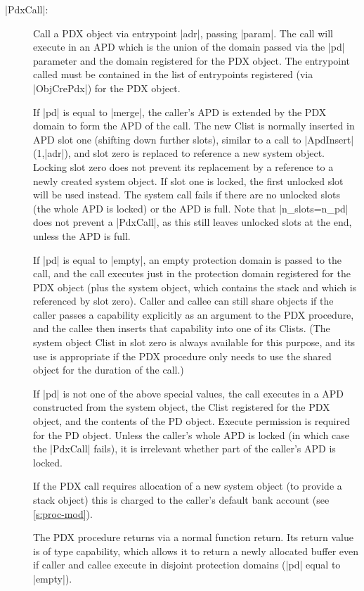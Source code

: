 \documentclass[a4paper,11pt,twoside,dvips]{report}
\begin{document}
\begin{description}
\begin{sloppypar}
\end{sloppypar}

\item[|PdxCall|:] Call a PDX object via entrypoint |adr|,
passing |param|. The call will execute in an APD which is the union of
the domain passed via the |pd| parameter and the domain registered for
the PDX object. The entrypoint called must be contained in the list of
entrypoints registered (via |ObjCrePdx|) for the PDX object.

If |pd| is equal to |merge|, the caller's APD is extended by the PDX
domain to form the APD of the call. The new Clist is normally inserted
in APD slot one (shifting down further slots), similar to a call to
|ApdInsert|(1,|adr|), and slot zero is replaced to reference a new
system object. Locking slot zero does not prevent its replacement by a
reference to a newly created system object. If slot one is locked, the
first unlocked slot will be used instead. The system call fails if there
are no unlocked slots (the whole APD is locked) or the APD is full. Note
that |n\_slots=n\_pd| does not prevent a |PdxCall|, as this still leaves
unlocked slots at the end, unless the APD is full.

If |pd| is equal to |empty|, an empty protection domain is passed to the
call, and the call executes just in the protection domain registered for
the PDX object (plus the system object, which contains the stack and
which is referenced by slot zero). Caller and callee can still share
objects if the caller passes a capability explicitly as an argument to
the PDX procedure, and the callee then inserts that capability into one
of its Clists. (The system object Clist in slot zero is always available
for this purpose, and its use is appropriate if the PDX procedure only
needs to use the shared object for the duration of the call.)

If |pd| is not one of the above special values, the call executes in a
APD constructed from the system object, the Clist registered for the PDX
object, and the contents of the PD object. Execute permission is
required for the PD object. Unless the caller's whole APD is locked (in
which case the |PdxCall| fails), it is irrelevant whether part of the
caller's APD is locked.

If the PDX call requires allocation of a new system object (to provide a
stack object) this is charged to the caller's default bank account (see
\autoref{s:proc-mod}).

The PDX procedure returns via a normal function return. Its return value
is of type capability, which allows it to return a newly allocated
buffer even if caller and callee execute in disjoint protection domains
(|pd| equal to |empty|).


\end{description}
\end{document}
